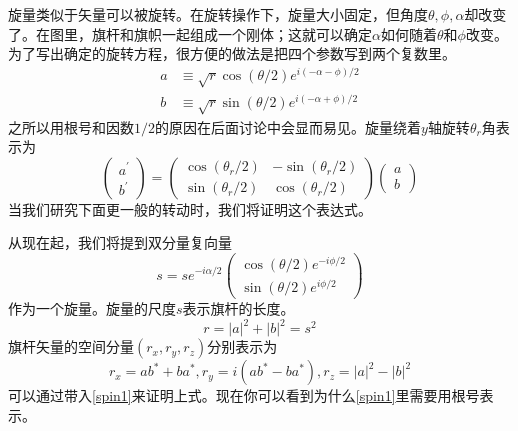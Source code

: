 \documentclass[a4paper,12pt]{article}
\begin{document}
    旋量类似于矢量可以被旋转。在旋转操作下，旋量大小固定，但角度$\theta,\phi,\alpha$却改变了。在图里，旗杆和旗帜一起组成一个刚体；这就可以确定$\alpha$如何随着$\theta$和$\phi$改变。为了写出确定的旋转方程，很方便的做法是把四个参数写到两个复数里。
    \begin{equation}
        \begin{aligned}
            a & \equiv \sqrt{r} \cos (\theta / 2) e^{i(-\alpha-\phi) / 2} \\
            b & \equiv \sqrt{r} \sin (\theta / 2) e^{i(-\alpha+\phi) / 2}
        \end{aligned}
    \end{equation}\label{spin1}
    之所以用根号和因数$1/2$的原因在后面讨论中会显而易见。旋量绕着$y$轴旋转$\theta_r$角表示为
    \begin{equation}
        \left(\begin{array}{l}
            a^{\prime} \\
            b^{\prime}
            \end{array}\right)=\left(\begin{array}{cc}
            \cos \left(\theta_{r} / 2\right) & -\sin \left(\theta_{r} / 2\right) \\
            \sin \left(\theta_{r} / 2\right) & \cos \left(\theta_{r} / 2\right)
            \end{array}\right)\left(\begin{array}{l}
            a \\
            b
        \end{array}\right)
    \end{equation}\label{spin2}
    当我们研究下面更一般的转动时，我们将证明这个表达式。

    从现在起，我们将提到双分量复向量
    \begin{equation}
        s=s e^{-i \alpha / 2}\left(\begin{array}{c}
            \cos (\theta / 2) e^{-i \phi / 2} \\
            \sin (\theta / 2) e^{i \phi / 2}
            \end{array}\right)
    \end{equation}\label{spin3}
    作为一个旋量。旋量的尺度$s$表示旗杆的长度。
    \begin{equation}
        r=|a|^{2}+|b|^{2}=s^{2}
    \end{equation}\label{spin4}
    旗杆矢量的空间分量$(r_x,r_y,r_z)$分别表示为
    \begin{equation}
        r_{x}=a b^{*}+b a^{*}, r_{y}=i\left(a b^{*}-b a^{*}\right), r_{z}=|a|^{2}-|b|^{2}
    \end{equation}\label{spin5}
    可以通过带入\eqref{spin1}来证明上式。现在你可以看到为什么\eqref{spin1}里需要用根号表示。
\end{document}
